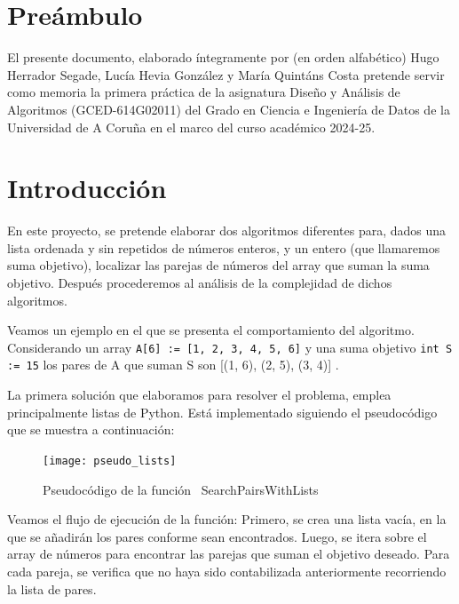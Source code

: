 \documentclass[a4paper, titlepage]{article}
\begin{document}
\newpage

\tableofcontents

\newpage

\section*{Preámbulo}

El presente documento, elaborado íntegramente por (en orden alfabético) Hugo Herrador Segade, Lucía Hevia González y María Quintáns Costa pretende servir como memoria la primera práctica de la asignatura Diseño y Análisis de Algoritmos (GCED-614G02011) del Grado en Ciencia e Ingeniería de Datos de la Universidad de A Coruña en el marco del curso académico 2024-25.

\section{Introducción}

En este proyecto, se pretende elaborar dos algoritmos diferentes para, dados una lista ordenada y sin repetidos de números enteros, y un entero (que llamaremos suma objetivo), localizar las parejas de números del array que suman la suma objetivo. Después procederemos al análisis de la complejidad de dichos algoritmos.

Veamos un ejemplo en el que se presenta el comportamiento del algoritmo. Considerando un array  \texttt{A[6] := [1, 2, 3, 4, 5, 6]} y una suma objetivo \texttt{int S := 15} los pares de A que suman S son [(1, 6), (2, 5), (3, 4)] .

La primera solución que elaboramos para resolver el problema, emplea principalmente listas de Python. Está implementado siguiendo el pseudocódigo que se muestra a continuación:

\begin{figure}[h]


\texttt{[image: pseudo\_lists]}

\caption{Pseudocódigo de la función \
{SearchPairsWithLists}}


\end{figure}

Veamos el flujo de ejecución de la función: Primero, se crea una lista vacía, en la que se añadirán los pares conforme sean encontrados. Luego, se itera sobre el array de números para encontrar las parejas que suman el objetivo deseado. Para cada pareja, se verifica que no haya sido contabilizada anteriormente recorriendo la lista de pares.
\end{document}
